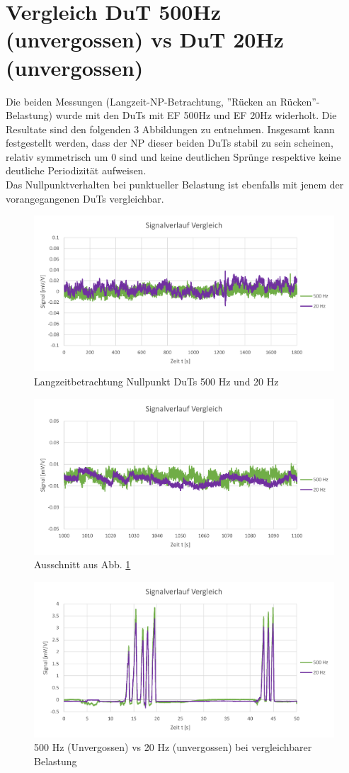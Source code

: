 \documentclass[12pt,a4paper]{article}
\begin{document}
\section{Vergleich DuT 500Hz (unvergossen) vs DuT 20Hz (unvergossen)}
Die beiden Messungen (Langzeit-NP-Betrachtung, ''Rücken an Rücken''-Belastung) wurde mit den DuTs mit EF 500Hz und EF 20Hz widerholt. Die Resultate  sind den folgenden 3 Abbildungen zu entnehmen. Insgesamt kann festgestellt werden, dass der NP dieser beiden DuTs stabil zu sein scheinen, relativ symmetrisch um 0 sind und keine deutlichen Sprünge respektive keine deutliche Periodizität aufweisen. \\
Das Nullpunktverhalten bei punktueller Belastung ist ebenfalls mit jenem der vorangegangenen DuTs vergleichbar.
\begin{figure}[H]
	\centering
	\includegraphics[width=1\linewidth]{imgs/daten_007_kpl}
	\caption{Langzeitbetrachtung Nullpunkt DuTs 500 Hz und 20 Hz}
	\label{fig:daten007kpl}
\end{figure}
\begin{figure}[H]
	\centering
	\includegraphics[width=1\linewidth]{imgs/daten_007_detail}
	\caption{Ausschnitt aus Abb. \ref{fig:daten007kpl}}
	\label{fig:daten007detail}
\end{figure}
\begin{figure}[H]
	\centering
	\includegraphics[width=1\linewidth]{imgs/daten_008_kpl}
	\caption{500 Hz (Unvergossen) vs 20 Hz (unvergossen) bei vergleichbarer Belastung}
	\label{fig:daten008kpl}
\end{figure}
	
\end{document}
